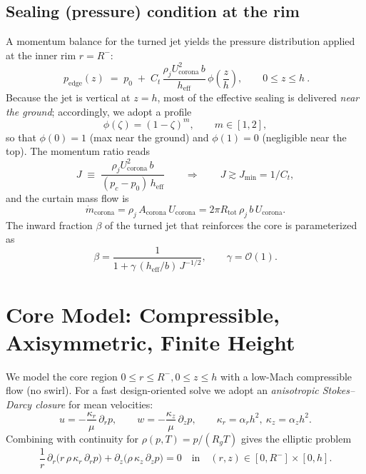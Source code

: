 \documentclass[11pt,a4paper]{article}
\begin{document}
\subsection{Sealing (pressure) condition at the rim}
A momentum balance for the turned jet yields the pressure distribution applied at the inner rim $r=R^-$:
\begin{equation}
  \boxed{\
  p_\mathrm{edge}(z) \;=\; p_0 \;+\;
  C_t\,\frac{\rho_j U_{\mathrm{corona}}^{2}\,b}{h_{\mathrm{eff}}}\,\phi\!\left(\frac{z}{h}\right),
  \qquad 0\le z\le h \ }.
  \label{eq:curtain_force}
\end{equation}
Because the jet is vertical at $z=h$, most of the effective sealing is delivered \emph{near the ground}; accordingly, we adopt a profile
\begin{equation}
  \phi(\zeta)=(1-\zeta)^{m},\qquad m\in[1,2],
  \label{eq:phi}
\end{equation}
so that $\phi(0)=1$ (max near the ground) and $\phi(1)=0$ (negligible near the top). The momentum ratio reads
\begin{equation}
  J \;\equiv\; \frac{\rho_j U_{\mathrm{corona}}^{2}\,b}{(p_c-p_0)\,h_{\mathrm{eff}}}
  \qquad\Rightarrow\qquad J\gtrsim J_{\min}=1/C_t,
  \label{eq:J}
\end{equation}
and the curtain mass flow is
\begin{equation}
  \dot m_{\mathrm{corona}} = \rho_j\,A_{\mathrm{corona}}\,U_{\mathrm{corona}}
  = 2\pi R_{\text{tot}}\,\rho_j\,b\,U_{\mathrm{corona}}.
  \label{eq:mcorona}
\end{equation}
The inward fraction $\beta$ of the turned jet that reinforces the core is parameterized as
\begin{equation}
  \beta = \frac{1}{1+\gamma\,(h_{\mathrm{eff}}/b)\,J^{-1/2}},\qquad \gamma=\mathcal{O}(1).
  \label{eq:beta}
\end{equation}

\section{Core Model: Compressible, Axisymmetric, Finite Height}
We model the core region $0\le r\le R^-, 0\le z\le h$ with a low-Mach compressible flow (no swirl). For a fast design-oriented solve we adopt an \emph{anisotropic Stokes--Darcy closure} for mean velocities:
\begin{equation}
  u = -\frac{\kappa_r}{\mu}\,\partial_r p,\qquad
  w = -\frac{\kappa_z}{\mu}\,\partial_z p,
  \qquad \kappa_r=\alpha_r h^2,\ \kappa_z=\alpha_z h^2.
  \label{eq:darcy}
\end{equation}
Combining with continuity for $\rho(p,T)=p/(R_g T)$ gives the elliptic problem
\begin{equation}
  \frac{1}{r}\,\partial_r\!\big(r\,\rho\,\kappa_r\,\partial_r p\big)+\partial_z\!\big(\rho\,\kappa_z\,\partial_z p\big)=0
  \quad\text{in}\quad (r,z)\in[0,R^-]\times[0,h].
  \label{eq:elliptic}
\end{equation}
\end{document}

